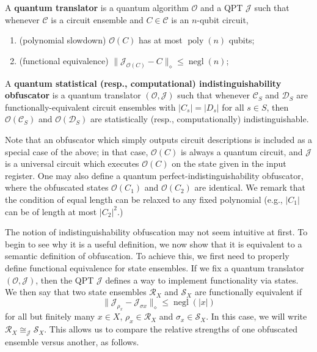 \documentclass[envcountsame]{llncs}
\numberwithin{equation}{section}
\newcommand{\opn}{\operatorname}
\newcommand{\algo}{\mathcal}
\newcommand{\negl}{\opn{negl}}
\newcommand{\poly}{\opn{poly}}
\begin{document}
\begin{definition}\label{def:translator}
A \textbf{quantum translator} is a quantum algorithm $\mathcal O$ and a QPT $\mathcal J$ such that whenever $\mathcal C$ is a circuit ensemble and $C \in \mathcal C$ is an $n$-qubit circuit, 
\begin{enumerate}
\item (polynomial slowdown) $\mathcal O(C)$ has at most $\poly(n)$ qubits;
\item (functional equivalence) $\bigl\| \algo J_{\mathcal O(C)} - C \bigr\|_\diamond \leq \negl(n)$;
\end{enumerate}
\end{definition}

\begin{definition}\label{def:indistinguishability}
A \textbf{quantum statistical (resp., computational) indistinguishability obfuscator} is a quantum translator $(\mathcal O, \mathcal J)$ such that whenever $\mathcal C_S$ and $\mathcal D_S$ are functionally-equivalent circuit ensembles with $|C_s| = |D_s|$ for all $s \in S$, then $\mathcal O(\mathcal C_S)$ and $\mathcal O(\mathcal D_S)$ are statistically (resp., computationally) indistinguishable.
\end{definition}

Note that an obfuscator which simply outputs circuit descriptions is included as a special case of the above; in that case, $\mathcal O(C)$ is always a quantum circuit, and $\mathcal J$ is a universal circuit which executes $\mathcal O(C)$ on the state given in the input register. One may also define a quantum perfect-indistinguishability obfuscator, where the obfuscated states $\mathcal O(C_1)$ and $\mathcal O(C_2)$ are identical. We remark that the condition of equal length can be relaxed to any fixed polynomial (e.g., $|C_1|$ can be of length at most $|C_2|^2$.)

The notion of indistinguishability obfuscation may not seem intuitive at first. To begin to see why it is a useful definition, we now show that it is equivalent to a semantic definition of obfuscation. To achieve this, we first need to properly define functional equivalence for state ensembles. If we fix a quantum translator $(\mathcal O, \mathcal J)$, then the QPT $\mathcal J$ defines a way to implement functionality via states. We then say that two state ensembles $\mathcal R_X$ and $\mathcal S_X$ are functionally equivalent if
$$
\bigl\| \algo J_{\rho_x} - \algo J_{\sigma x} \bigr\|_\diamond \leq \negl(|x|)
$$
for all but finitely many $x \in X$, $\rho_x \in \mathcal R_X$ and $\sigma_x \in \mathcal S_X$. In this case, we will write $\mathcal R_X \cong_{\algo J} \mathcal S_X$. This allows us to compare the relative strengths of one obfuscated ensemble versus another, as follows.
\end{document}
